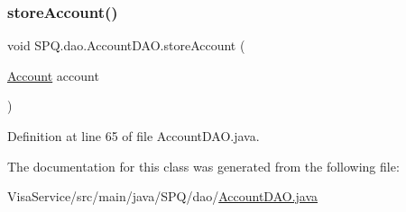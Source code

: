 \subsubsection{\texorpdfstring{store\+Account()}{storeAccount()}}
{\footnotesize\ttfamily void S\+P\+Q.\+dao.\+Account\+D\+A\+O.\+store\+Account (\begin{DoxyParamCaption}\item[{\mbox{\hyperlink{class_s_p_q_1_1data_1_1_account}{Account}}}]{account }\end{DoxyParamCaption})}



Definition at line 65 of file Account\+D\+A\+O.\+java.



The documentation for this class was generated from the following file\+:\begin{DoxyCompactItemize}
\item 
Visa\+Service/src/main/java/\+S\+P\+Q/dao/\mbox{\hyperlink{_account_d_a_o_8java}{Account\+D\+A\+O.\+java}}\end{DoxyCompactItemize}
